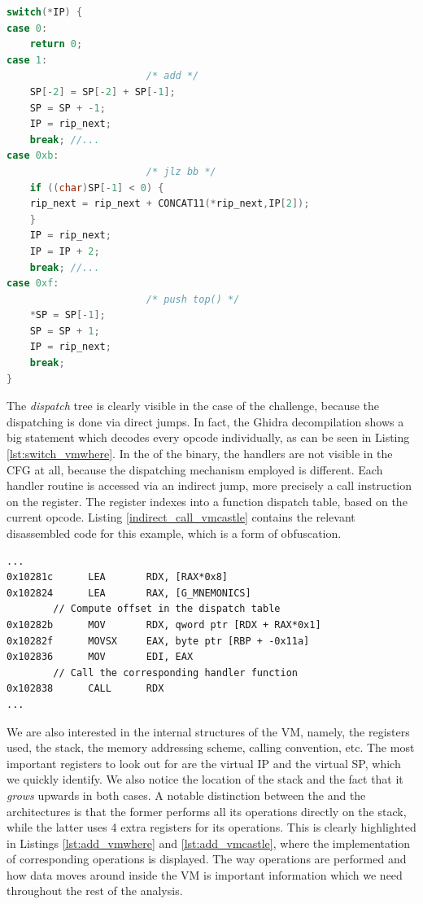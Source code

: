 \begin{lstlisting}[language=c, label={lst:switch_vmwhere}, caption={Decompilation section of the \cc{vmwhere} dispatcher, after variable renaming and retyping. We notice the implementation of the \cc{add}, \cc{jlz} and \cc{push_top} instructions.}]
switch(*IP) {
case 0:
    return 0;
case 1:
                        /* add */
    SP[-2] = SP[-2] + SP[-1];
    SP = SP + -1;
    IP = rip_next;
    break; //...
case 0xb:
                        /* jlz bb */
    if ((char)SP[-1] < 0) {
    rip_next = rip_next + CONCAT11(*rip_next,IP[2]);
    }
    IP = rip_next;
    IP = IP + 2;
    break; //...
case 0xf:
                        /* push top() */
    *SP = SP[-1];
    SP = SP + 1;
    IP = rip_next;
    break;
}
\end{lstlisting}

The \emph{dispatch} tree is clearly visible in the case of the  challenge, because the dispatching is done via direct jumps. In fact, the Ghidra decompilation shows a big  statement which decodes every opcode individually, as can be seen in Listing \ref{lst:switch_vmwhere}. In the of the  binary, the handlers are not visible in the \gls{CFG} at all, because the dispatching mechanism employed is different. Each handler routine is accessed via an indirect jump, more precisely a call instruction on the  register. The  register indexes into a function dispatch table, based on the current opcode. Listing \ref{indirect_call_vmcastle} contains the relevant disassembled code for this example, which is a form of obfuscation.

\begin{lstlisting}[label={lst:indirect_call_vmcastle}, caption={x86\_64 disassembly of the \cc{vmcastle} dispatcher. The function handler corresponding to the current opcode is indirectly called through the register \cc{RDX}.}]
...
0x10281c      LEA       RDX, [RAX*0x8]
0x102824      LEA       RAX, [G_MNEMONICS]
        // Compute offset in the dispatch table
0x10282b      MOV       RDX, qword ptr [RDX + RAX*0x1] 
0x10282f      MOVSX     EAX, byte ptr [RBP + -0x11a]
0x102836      MOV       EDI, EAX
        // Call the corresponding handler function
0x102838      CALL      RDX  
...
\end{lstlisting}

We are also interested in the internal structures of the \gls{VM}, namely, the
registers used, the stack, the memory addressing scheme, calling convention,
etc. The most important registers to look out for are the virtual \gls{IP} and
the virtual \gls{SP}, which we quickly identify. We also notice the location of
the stack and the fact that it \emph{grows} upwards in both cases. A notable
distinction between the  and the  architectures is that
the former performs all its operations directly on the stack, while the latter
uses 4 extra registers for its operations. This is clearly highlighted in
Listings \ref{lst:add_vmwhere} and \ref{lst:add_vmcastle}, where the
implementation of corresponding  operations is displayed. The way
operations are performed and how data moves around inside the \gls{VM} is
important information which we need throughout the rest of the analysis.

